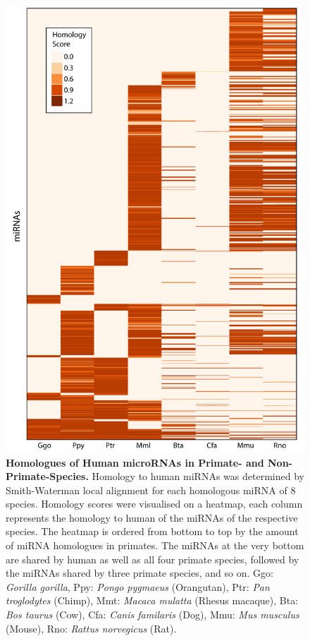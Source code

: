 \begin{figure}
\includegraphics[width=\textwidth]{figures/species-homo}
\caption[microRNA Species Homology.]{\textbf{Homologues of Human microRNAs in Primate- and Non-Primate-Species.} Homology to human miRNAs was determined by Smith-Waterman local alignment for each homologous miRNA of 8 species. Homology scores were visualised on a heatmap, each column represents the homology to human of the miRNAs of the respective species. The heatmap is ordered from bottom to top by the amount of miRNA homologues in primates. The miRNAs at the very bottom are shared by human as well as all four primate species, followed by the miRNAs shared by three primate species, and so on. Ggo: \emph{Gorilla gorilla}, Ppy: \emph{Pongo pygmaeus} (Orangutan), Ptr: \emph{Pan troglodytes} (Chimp), Mmt: \emph{Macaca mulatta} (Rhesus macaque), Bta: \emph{Bos taurus} (Cow), Cfa: \emph{Canis familaris} (Dog), Mmu: \emph{Mus musculus} (Mouse), Rno: \emph{Rattus norvegicus} (Rat).
\label{fig:species-homo}}
\end{figure}

